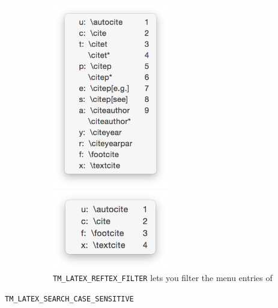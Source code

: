 \documentclass[11pt, x11names]{article}
\begin{document}
\begin{description}
    \begin{figure}[htbp]
        \begin{minipage}[t]{0.5\textwidth}
          \vspace{0cm}
          \centering
            \includegraphics[width=0.5\textwidth]{Figures/Citation Completion - Without Ref-TeX Filter}
        \end{minipage}
        \begin{minipage}[t]{0.5\textwidth}
          \vspace{0cm}
          \centering
            \includegraphics[width=0.5\textwidth]{Figures/Citation Completion - With Ref-TeX Filter}
        \end{minipage}

        \caption{\texttt{\texttt{TM\_LATEX\_REFTEX\_FILTER}} lets you filter the menu entries of }
        \label{fig:TM_LATEX_REFTEX_FILTER}
    \end{figure}

    \item[\texttt{TM\_LATEX\_SEARCH\_CASE\_SENSITIVE}]~\\


\end{description}
\end{document}
